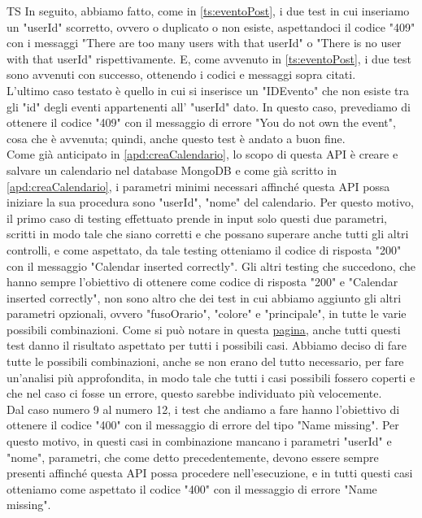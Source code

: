 \begin{listaPersonale}{TS}
                In seguito, abbiamo fatto, come in \ref{ts:eventoPost}, i due test in cui inseriamo un "userId" scorretto, ovvero o duplicato o non esiste, aspettandoci il codice "409" con i messaggi "There are too many users with that userId" o "There is no user with that userId" rispettivamente. E, come avvenuto in \ref{ts:eventoPost}, i due test sono avvenuti con successo, ottenendo i codici e messaggi sopra citati.
                 \\
                L'ultimo caso testato è quello in cui si inserisce un "IDEvento" che non esiste tra gli "id" degli eventi appartenenti all' "userId" dato. In questo caso, prevediamo di ottenere il codice "409" con il messaggio di errore "You do not own the event", cosa che è avvenuta; quindi, anche questo test è andato a buon fine.
                 \\
                Come già anticipato in \ref{apd:creaCalendario}, lo scopo di questa API è creare e salvare un calendario nel database MongoDB e come già scritto in \ref{apd:creaCalendario}, i parametri minimi necessari affinché questa API possa iniziare la sua procedura sono "userId", "nome" del calendario. Per questo motivo, il primo caso di testing effettuato prende in input solo questi due parametri, scritti in modo tale che siano corretti e che possano superare anche tutti gli altri controlli, e come aspettato, da tale testing otteniamo il codice di risposta "200" con il messaggio "Calendar inserted correctly". Gli altri testing che succedono, che hanno sempre l'obiettivo di ottenere come codice di risposta "200" e "Calendar inserted correctly", non sono altro che dei test in cui abbiamo aggiunto gli altri parametri opzionali, ovvero "fusoOrario", "colore" e "principale", in tutte le varie possibili combinazioni. Come si può notare in questa \href{https://plan-it.it/test-report.html} {pagina}, anche tutti questi test danno il risultato aspettato per tutti i possibili casi. Abbiamo deciso di fare tutte le possibili combinazioni, anche se non erano del tutto necessario, per fare un'analisi più approfondita, in modo tale che tutti i casi possibili fossero coperti e che nel caso ci fosse un errore, questo sarebbe individuato più velocemente. \\
                Dal caso numero 9 al numero 12, i test che andiamo a fare hanno l'obiettivo di ottenere il codice "400" con il messaggio di errore del tipo "Name missing". Per questo motivo, in questi casi in combinazione mancano i parametri "userId" e "nome", parametri, che come detto precedentemente, devono essere sempre presenti affinché questa API possa procedere nell'esecuzione, e in tutti questi casi otteniamo come aspettato il codice "400" con il messaggio di errore "Name missing". \\

\end{listaPersonale}
